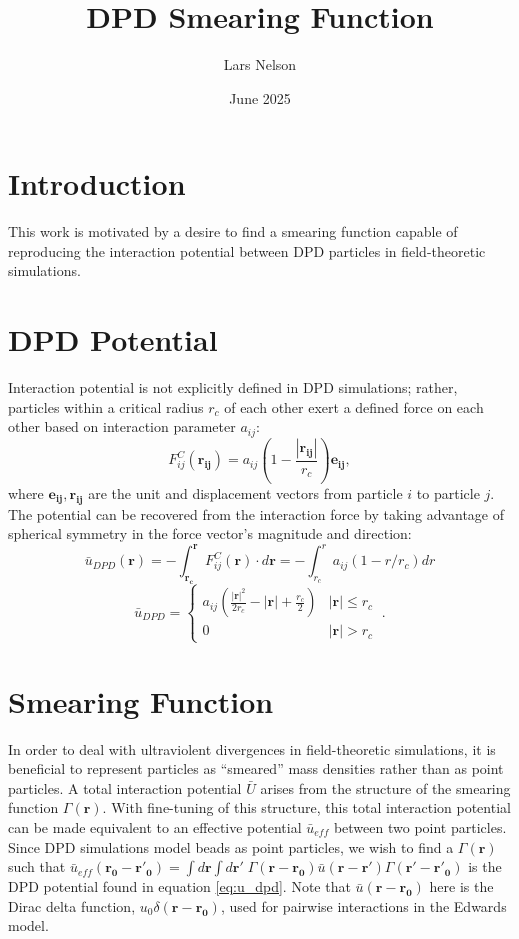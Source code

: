 \documentclass{article}
\title{DPD Smearing Function}
\author{Lars Nelson}
\date{June 2025}
\begin{document}
\maketitle

\section{Introduction}
This work is motivated by a desire to find a smearing function capable of reproducing the interaction potential between DPD particles in field-theoretic simulations.

\section{DPD Potential}
Interaction potential is not explicitly defined in DPD simulations; rather, particles within a critical radius \(r_c\) of each other exert a defined force on each other based on interaction parameter \(a_{ij}\):
\[F_{ij}^C(\mathbf{r_{ij}}) = a_{ij}\left(1-\frac{|\mathbf{r_{ij}}|}{r_c}\right)\mathbf{e_{ij}},\]
\noindent where \(\mathbf{e_{ij}, r_{ij}}\) are the unit and displacement vectors from particle \(i\) to particle \(j\). The potential can be recovered from the interaction force by taking advantage of spherical symmetry in the force vector's magnitude and direction:
\[\bar{u}_{DPD} (\mathbf{r}) = -\int^\mathbf{r}_\mathbf{r_c} F^C_{ij}(\mathbf{r}) \cdot d\mathbf{r} = -\int_{r_c}^r a_{ij}(1-r/r_c)dr\]
\begin{equation}
    \bar{u}_{DPD}= \begin{cases} a_{ij}\left(\frac{|\mathbf{r}|^2}{2r_c} - |\mathbf{r}| + \frac{r_c}{2}\right) & |\mathbf{r}| \leq r_c \\
    0 & |\mathbf{r}| > r_c
    \end{cases}\:.
    \label{eq:u_dpd}
\end{equation}

\section{Smearing Function}
In order to deal with ultraviolent divergences in field-theoretic simulations, it is beneficial to represent particles as ``smeared'' mass densities rather than as point particles. A total interaction potential \(\bar{U}\) arises from the structure of the smearing function \(\Gamma(\mathbf{r})\). With fine-tuning of this structure, this total interaction potential can be made equivalent to an effective potential \(\bar{u}_{eff}\) between two point particles. Since DPD simulations model beads as point particles, we wish to find a \(\Gamma({\mathbf{r}})\) such that \(\bar{u}_{eff}(\mathbf{r_0}-\mathbf{r'_0}) = \int d\mathbf{r}\int d\mathbf{r'} \; \Gamma(\mathbf{r}-\mathbf{r_0}) \bar{u}(\mathbf{r}-\mathbf{r'}) \Gamma(\mathbf{r'}-\mathbf{r'_0})\) is the DPD potential found in equation \ref{eq:u_dpd}. Note that \(\bar{u}(\mathbf{r}-\mathbf{r_0})\) here is the Dirac delta function, \(u_0\delta(\mathbf{r}-\mathbf{r_0})\), used for pairwise interactions in the Edwards model.
\end{document}
